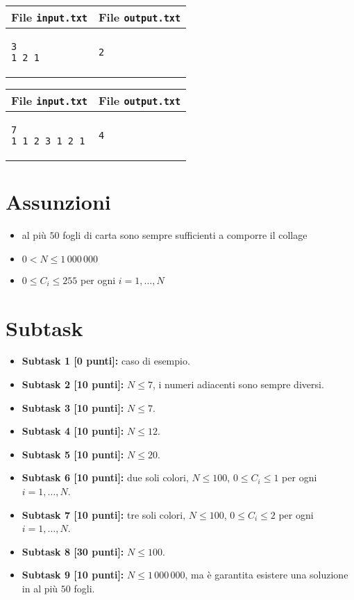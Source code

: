 \documentclass[a4paper,11pt]{article}
\begin{document}
  
    \noindent
    \begin{tabular}{p{11cm}|p{5cm}}
    \toprule
    \textbf{File \texttt{input.txt}}
    & \textbf{File \texttt{output.txt}}
    \\
    \midrule
    \scriptsize
    \begin{verbatim}
3 
1 2 1
\end{verbatim}
    &
    \scriptsize
    \begin{verbatim}
2
\end{verbatim}
    \\
    \bottomrule
    \end{tabular}
  
    \noindent
    \begin{tabular}{p{11cm}|p{5cm}}
    \toprule
    \textbf{File \texttt{input.txt}}
    & \textbf{File \texttt{output.txt}}
    \\
    \midrule
    \scriptsize
    \begin{verbatim}
7
1 1 2 3 1 2 1
\end{verbatim}
    &
    \scriptsize
    \begin{verbatim}
4
\end{verbatim}
    \\
    \bottomrule
    \end{tabular}

    
\section*{Assunzioni}
  \begin{itemize}
    \item al più $50$ fogli di carta sono sempre sufficienti a comporre il collage
    \item $0 < N ≤ 1\,000\,000$
    \item $0 \leq C_{i} \leq 255$ per ogni $i=1,\ldots, N$
  \end{itemize}
  
\section*{Subtask}
\begin{itemize}
\item \textbf{Subtask 1 [0 punti]:} caso di esempio.
\item \textbf{Subtask 2 [10 punti]:} $N \leq 7$, i numeri adiacenti sono sempre diversi.
\item \textbf{Subtask 3 [10 punti]:} $N \leq 7$.
\item \textbf{Subtask 4 [10 punti]:} $N \leq 12$.
\item \textbf{Subtask 5 [10 punti]:} $N \leq 20$.
\item \textbf{Subtask 6 [10 punti]:} due soli colori, $N \leq 100$, $0 \leq C_{i} \leq 1$ per ogni $i=1,\ldots, N$.
\item \textbf{Subtask 7 [10 punti]:} tre soli colori, $N \leq 100$, $0 \leq C_{i} \leq 2$ per ogni $i=1,\ldots, N$.
\item \textbf{Subtask 8 [30 punti]:} $N \leq 100$.
\item \textbf{Subtask 9 [10 punti]:} $N \le 1\,000\,000$, ma è garantita esistere una soluzione in al più $50$ fogli.  
\end{itemize}
  
\end{document}
